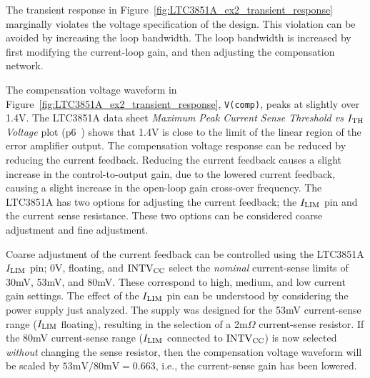 The transient response in Figure~\ref{fig:LTC3851A_ex2_transient_response}
marginally violates the voltage specification of the design.
This violation can be avoided by increasing the loop bandwidth.
The loop bandwidth is increased by first modifying the current-loop
gain, and then adjusting the compensation network.

The compensation voltage waveform in Figure~\ref{fig:LTC3851A_ex2_transient_response},
\verb+V(comp)+, peaks at slightly over 1.4V. The LTC3851A data sheet
{\em Maximum Peak Current Sense Threshold vs $I_{\rm TH}$ Voltage} plot 
(p6~\cite{Linear_LTC3851A_2010}) shows that 1.4V is close to the limit
of the linear region of the error amplifier output.
The compensation voltage response can be reduced by reducing the current feedback.
Reducing the current feedback causes a slight increase
in the control-to-output gain, due to the lowered current feedback,
causing a slight increase in the open-loop gain cross-over frequency.
The LTC3851A has two options for adjusting the current feedback;
the $I_{\rm LIM}$ pin and the current sense resistance. These two
options can be considered coarse adjustment and fine adjustment.

Coarse adjustment of the current feedback can be controlled using
the LTC3851A $I_{\rm LIM}$ pin; 0V, floating, and $\text{INTV}_{\rm CC}$
select the {\em nominal} current-sense limits of 30mV, 53mV, and 80mV. 
These correspond to high, medium, and low current gain settings.
The effect of the $I_{\rm LIM}$ pin can be understood by considering
the power supply just analyzed. The supply was designed for the
53mV current-sense range ($I_{\rm LIM}$ floating), resulting in the
selection of a 2m$\Omega$ current-sense resistor. If the
80mV current-sense range ($I_{\rm LIM}$ connected to $\text{INTV}_{\rm CC}$)
is now selected {\em without} changing the sense resistor, then the
compensation voltage waveform will be scaled by $53\text{mV}/80\text{mV} = 0.663$,
i.e., the current-sense gain has been lowered.

